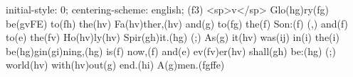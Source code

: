initial-style: 0;
centering-scheme: english;
(f3) <sp>v</sp> Glo(hg)ry(fg) be(gvFE) to(fh) the(hv) Fa(hv)ther,(hv) and(g) to(fg) the(f) Son:(f) (,) and(f) to(e) the(fv) Ho(hv)ly(hv) Spir(gh)it.(hg) (;) As(g) it(hv) was(ij) in(i) the(i) be(hg)gin(gi)ning,(hg) is(f) now,(f) and(e) ev(fv)er(hv) shall(gh) be:(hg) (;) world(hv) with(hv)out(g) end.(hi) A(g)men.(fgffe)
